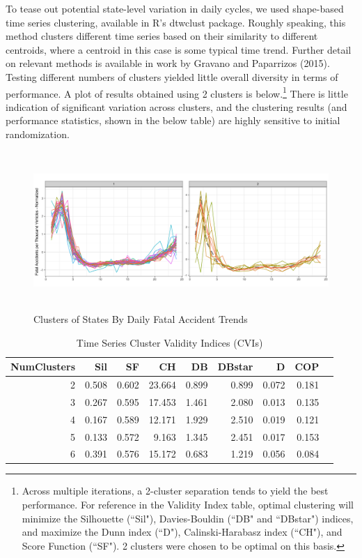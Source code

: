 \documentclass[11pt, oneside,titlepage]{article}   	%
\begin{document}
To tease out potential state-level variation in daily cycles, we used shape-based time series clustering, available in R's dtwclust package. Roughly speaking, this method clusters different time series based on their similarity to different centroids, where a centroid in this case is some typical time trend. Further detail on relevant methods is available in work by Gravano and Paparrizos (2015). Testing different numbers of clusters yielded little overall diversity in terms of performance. A plot of results obtained using 2 clusters is below.\footnote{Across multiple iterations, a 2-cluster separation tends to yield the best performance. For reference in the Validity Index table, optimal clustering will minimize the Silhouette (``Sil"), Davies-Bouldin (``DB" and ``DBstar") indices, and maximize the Dunn index (``D"), Calinski-Harabasz index (``CH"), and Score Function (``SF"). 2 clusters were chosen to be optimal on this basis.} There is little indication of significant variation across clusters, and the clustering results (and performance statistics, shown in the below table) are highly sensitive to initial randomization. 

\begin{figure}[H]
\begin{center}
\includegraphics[width=.75\textwidth,height=6cm,keepaspectratio]{StateClusterPlot_Hourly.png}
\end{center}
\caption{Clusters of States By Daily Fatal Accident Trends}
\end{figure}

\begin{table}[H]
\centering
\begin{tabular}{rrrrrrrrr}
  \hline
 NumClusters & Sil & SF & CH & DB & DBstar & D & COP \\ 
  \hline
  2 & 0.508 & 0.602 & 23.664 & 0.899 & 0.899 & 0.072 & 0.181 \\ 
  3 & 0.267 & 0.595 & 17.453 & 1.461 & 2.080 & 0.013 & 0.135 \\ 
  4 & 0.167 & 0.589 & 12.171 & 1.929 & 2.510 & 0.019 & 0.121 \\ 
  5 & 0.133 & 0.572 & 9.163 & 1.345 & 2.451 & 0.017 & 0.153 \\ 
  6 & 0.391 & 0.576 & 15.172 & 0.683 & 1.219 & 0.056 & 0.084 \\ 
   \hline
\end{tabular}
\caption{Time Series Cluster Validity Indices (CVIs)} 
\end{table}
\end{document}
